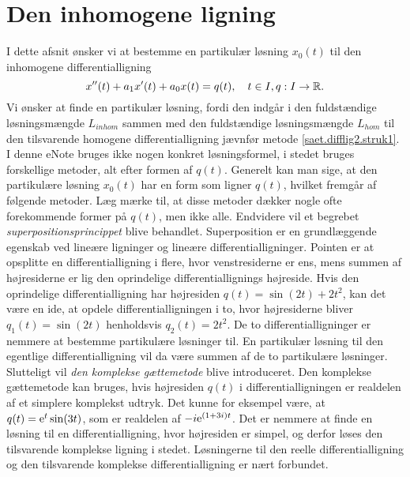 
\section{Den inhomogene ligning} \label{subsek.difflig2.inhom1}

I dette afsnit ønsker vi at bestemme en partikulær løsning $ x_0(t) $ til den inhomogene differentialligning
\begin{equation}
x''(t) + a_1x'(t) + a_0x(t) = q(t), \quad t \in I, q : I \rightarrow \mathbb{R}.
\end{equation}
Vi ønsker at finde en partikulær løsning, fordi den indgår i den fuldstændige løs\-nings\-mæng\-de $ L_{inhom} $ sammen med den fuldstændige løsningsmængde $ L_{hom} $ til den tilsvarende homogene differentialligning jævnfør metode \ref{saet.difflig2.struk1}. \bs
I denne eNote bruges ikke nogen konkret løsningsformel, i stedet bruges forskellige metoder, alt efter formen af $ q(t) $. Generelt kan man sige, at den partikulære løsning $ x_0(t) $ har en form som ligner $ q(t) $, hvilket fremgår af følgende metoder. Læg mærke til, at disse metoder dækker nogle ofte forekommende former på $ q(t) $, men ikke alle. \bs
Endvidere vil et begrebet \textit{superpositionsprincippet} blive behandlet. Superposition er en grundlæggende egenskab ved lineære ligninger og lineære differentialligninger. Pointen er at opsplitte en differentialligning i flere, hvor venstresiderne er ens, mens summen af højresiderne er lig den oprindelige differentiallignings højreside. Hvis den oprindelige differentialligning har højresiden $ q(t) = \sin(2t) + 2t^2 $, kan det være en ide, at opdele differentialligningen i to, hvor højresiderne bliver $ q_1(t) = \sin(2t) $ henholdsvis $ q_2(t) = 2t^2 $. De to differentialligninger er nemmere at bestemme partikulære løsninger til. En partikulær løsning til den egentlige differentialligning vil da være summen af de to partikulære løsninger. \bs
Slutteligt vil \textit{den komplekse gættemetode} blive introduceret. Den komplekse gættemetode kan bruges, hvis højresiden $ q(t) $ i differentialligningen er realdelen af et simplere komplekst udtryk. Det kunne for eksempel være, at $ q(t) = \mathrm{e}^t \sin(3t) $, som er realdelen af $ -i \mathrm{e}^{(1+3i)t} $. Det er nemmere at finde en løsning til en differentialligning, hvor højresiden er simpel, og derfor løses den tilsvarende komplekse ligning i stedet. Løsningerne til den reelle differentialligning og den tilsvarende komplekse differentialligning er nært forbundet. \bs

